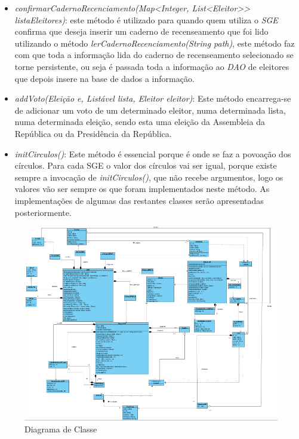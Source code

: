 \documentclass[a4paper,12pt]{report}
\begin{document}
\begin{itemize}
\item \emph{confirmarCadernoRecenciamento(Map<Integer, List<Eleitor>> listaEleitores)}:
este método é utilizado para quando quem utiliza o \emph{SGE} confirma que deseja inserir um caderno de  recenseamento que foi lido utilizando o método \emph{lerCadernoRecenciamento(String path)}, este método faz com que toda a informação lida do caderno de recenseamento selecionado se torne persistente, ou seja é passada toda a informação ao \emph{DAO} de eleitores que depois insere na base de dados a informação.
\item \emph{addVoto(Eleição e, Listável lista, Eleitor eleitor)}: Este método encarrega-se de adicionar um voto de um determinado eleitor, numa determinada lista, numa determinada eleição, sendo esta uma eleição da Assembleia da República ou da Presidência da República.
\item \emph{initCirculos()}: Este método é essencial porque é onde se faz a povoação dos círculos. Para cada SGE o valor dos círculos vai ser igual, porque existe sempre a invocação de \emph{initCirculos()}, que não recebe argumentos, logo os valores vão ser sempre os que foram implementados neste método.
 As implementações de algumas das restantes classes serão apresentadas posteriormente.
\end{itemize}


\begin{figure}[H]
\begin{center}
	\includegraphics[width=1.23\textwidth]{media/modelodominio/diagramaclass.png}
	 \caption{Diagrama de Classe}
\end{center}
\end{figure}
\end{document}
